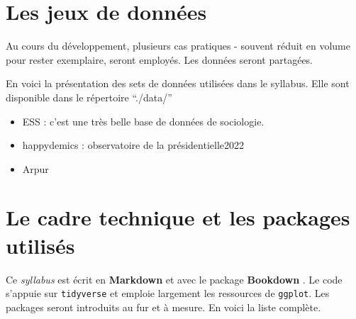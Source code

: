 \documentclass[
]{book}
\providecommand{\tightlist}{%
  \setlength{\itemsep}{0pt}\setlength{\parskip}{0pt}}
\begin{document}
\hypertarget{les-jeux-de-donnuxe9es}{%
\section{Les jeux de données}\label{les-jeux-de-donnuxe9es}}

Au cours du développement, plusieurs cas pratiques - souvent réduit en volume pour rester exemplaire, seront employés. Les données seront partagées.

En voici la présentation des sets de données utilisées dans le syllabus. Elle sont disponible dans le répertoire ``./data/''

\begin{itemize}
\tightlist
\item
  ESS : c'est une très belle base de données de sociologie.
\item
  happydemics : observatoire de la présidentielle2022
\item
  Arpur
\end{itemize}

\hypertarget{le-cadre-technique-et-les-packages-utilisuxe9s}{%
\section{Le cadre technique et les packages utilisés}\label{le-cadre-technique-et-les-packages-utilisuxe9s}}

Ce \emph{syllabus} est écrit en \textbf{Markdown} \citep{allaire_rmarkdown_2021} et avec le package \textbf{Bookdown} \citep{R-bookdown}. Le code s'appuie sur \texttt{tidyverse} et emploie largement les ressources de \texttt{ggplot}. Les packages seront introduits au fur et à mesure. En voici la liste complète.
\end{document}
